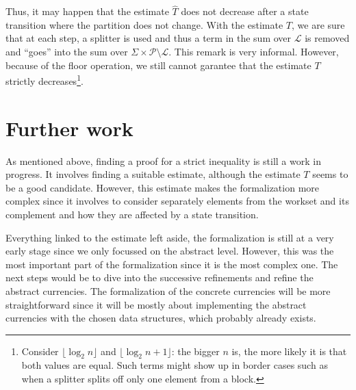 \documentclass[12pt, a4 paper]{article}
\theoremstyle{definition}
\begin{document}
Thus, it may happen that the estimate $\hat{T}$ does not decrease after a state transition where the partition does not change.
With the estimate $T$, we are sure that at each step, a splitter is used and thus a term in the sum over $\mathcal{L}$ is removed and ``goes'' into the sum over $\Sigma \times \mathcal{P} \setminus \mathcal{L}$.
This remark is very informal.
However, because of the floor operation, we still cannot garantee that the estimate $T$ strictly decreases\footnote{Consider $\lfloor \log_2 n \rfloor$ and $\lfloor \log_2 n+1 \rfloor$: the bigger $n$ is, the more likely it is that both values are equal. Such terms might show up in border cases such as when a splitter splits off only one element from a block.}.

\section{Further work}
As mentioned above, finding a proof for a strict inequality is still a work in progress. It involves finding a suitable estimate, although the estimate $T$ seems to be a good candidate. However, this estimate makes the formalization more complex since it involves to consider separately elements from the workset and its complement and how they are affected by a state transition.

Everything linked to the estimate left aside, the formalization is still at a very early stage since we only focussed on the abstract level. However, this was the most important part of the formalization since it is the most complex one. The next steps would be to dive into the successive refinements and refine the abstract currencies. The formalization of the concrete currencies will be more straightforward since it will be mostly about implementing the abstract currencies with the chosen data structures, which probably already exists.


% 

\pagebreak


\end{document}
